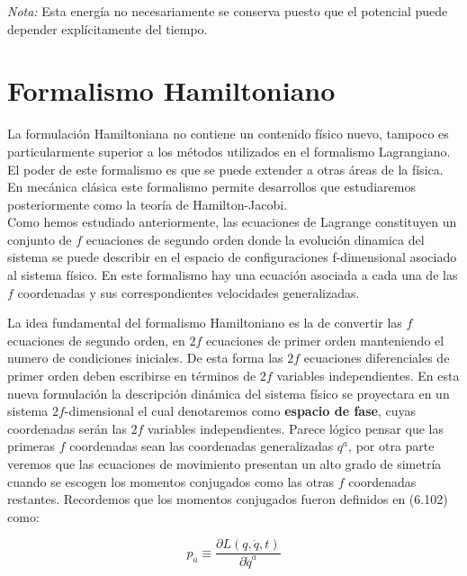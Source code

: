 \documentclass[12pt]{report}
\begin{document}
\textit{Nota:} Esta energía no necesariamente se conserva puesto que el potencial puede depender explícitamente del tiempo. 













\chapter{Formalismo Hamiltoniano}



La formulación Hamiltoniana no contiene un contenido físico nuevo, tampoco es particularmente superior a los métodos utilizados en el formalismo Lagrangiano. El poder de este formalismo es que se puede extender a otras áreas de la física. En mecánica clásica este formalismo permite desarrollos que estudiaremos posteriormente como la teoría de Hamilton-Jacobi. \\


Como hemos estudiado anteriormente, las ecuaciones de Lagrange constituyen un conjunto de $f$ ecuaciones de segundo orden donde la evolución dinamica del sistema se puede describir en el espacio de configuraciones f-dimensional asociado al sistema físico. En este formalismo hay una ecuación asociada a cada una de las $f$ coordenadas y sus correspondientes velocidades generalizadas.

La idea fundamental del formalismo Hamiltoniano es la de convertir las $f$ ecuaciones de segundo orden, en $2f$ ecuaciones de primer orden manteniendo el numero de condiciones iniciales. De esta forma las $2f$ ecuaciones diferenciales de primer orden deben escribirse en términos de $2f$ variables independientes. En esta nueva formulación la descripción dinámica del sistema físico se proyectara en un sistema $2f$-dimensional el cual denotaremos como \textbf{espacio de fase}, cuyas coordenadas serán las $2f$ variables independientes. Parece lógico pensar que las primeras $f$ coordenadas sean las coordenadas generalizadas $q^a$, por otra parte veremos que las ecuaciones de movimiento presentan un alto grado de simetría cuando se escogen los momentos conjugados como las otras $f$ coordenadas restantes. Recordemos que los momentos conjugados fueron definidos en (6.102)  como:

\begin{equation}
p_a \equiv \frac{\partial L(q,\dot{q},t)}{\partial \dot{q}^a}
\end{equation}
\end{document}
